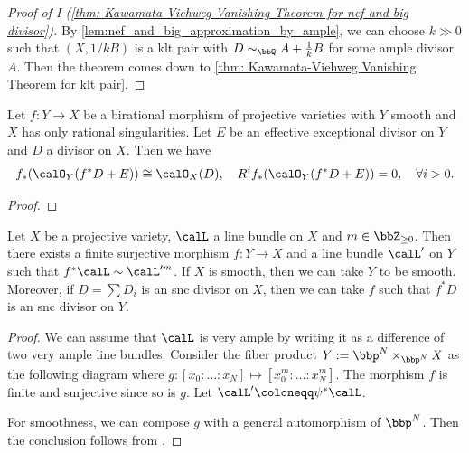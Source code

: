     \begin{proof}[Proof of I (\cref{thm: Kawamata-Viehweg Vanishing Theorem for nef and big divisor})]
        By \cref{lem:nef_and_big_approximation_by_ample}, we can choose \(k \gg 0\) such that \((X,1/k B)\) is a klt pair with \(D \sim_\bbQ A + \frac{1}{k}B\) for some ample divisor \(A\).
        Then the theorem comes down to \cref{thm: Kawamata-Viehweg Vanishing Theorem for klt pair}.
    \end{proof}

    \begin{lemma}\label{lem:higher_direct_image_of_exceptional_divisor}
        Let \(f:Y \to X\) be a birational morphism of projective varieties with \(Y\) smooth and \(X\) has only rational singularities.
        Let \(E\) be an effective exceptional divisor on \(Y\) and \(D\) a divisor on \(X\).
        Then we have
        \[ f_*(\calO_Y(f^*D + E)) \cong \calO_X(D), \quad R^if_*(\calO_Y(f^*D + E)) = 0,\quad \forall i > 0. \]
    \end{lemma}
    \begin{proof}
    \end{proof}

    \begin{lemma}\label{lem: divide a divisor by a finite surjective morphism}
        Let \(X\) be a projective variety, \(\calL\) a line bundle on \(X\) and \(m \in \bbZ_{\geq 0}\).
        Then there exists a finite surjective morphism \(f: Y \to X\) and a line bundle \(\calL'\) on \(Y\) such that \(f^*\calL \sim \calL'^{m}\).
        If \(X\) is smooth, then we can take \(Y\) to be smooth.
        Moreover, if \(D = \sum D_i\) is an snc divisor on \(X\), then we can take \(f\) such that \(f^*D\) is an snc divisor on \(Y\).
    \end{lemma}
    \begin{proof}
        We can assume that \(\calL\) is very ample by writing it as a difference of two very ample line bundles.
        Consider the fiber product \(Y:= \bbp^N \times_{\bbp^N} X\) as the following diagram
        \Yang{}
        where \(g: [x_0: \ldots: x_N] \mapsto [x_0^m: \ldots: x_N^m]\).
        The morphism \(f\) is finite and surjective since so is \(g\).
        Let \(\calL'\coloneqq \psi^*\calL\).

        For smoothness, we can compose \(g\) with a general automorphism of \(\bbp^N\).
        Then the conclusion follows from \cite[Chapter III, Theorem 10.8]{Har77}.
    \end{proof}

